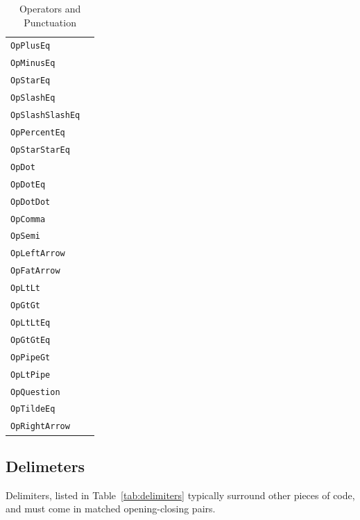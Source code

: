 \begin{table}[h]
{\begin{tabular}[t]{ll}
        \hline
        \texttt{OpPlusEq} & \op{+=} \\
        \texttt{OpMinusEq} & \op{-=} \\
        \texttt{OpStarEq} & \op{*=} \\
        \texttt{OpSlashEq} & \op{/=} \\
        \texttt{OpSlashSlashEq} & \op{//=} \\
        \texttt{OpPercentEq} & \op{\%=} \\
        \texttt{OpStarStarEq} & \op{**=} \\
        \hline
        \texttt{OpDot} & \op{.} \\
        \texttt{OpDotEq} & \op{.=} \\
        \texttt{OpDotDot} & \op{..} \\
        \texttt{OpComma} & \op{,} \\
        \texttt{OpSemi} & \op{;} \\
        \texttt{OpLeftArrow} & \op{<-} \\
        \texttt{OpFatArrow} & \op{=>} \\
        \hline
        \texttt{OpLtLt} & \op{<<} \\
        \texttt{OpGtGt} & \op{>>} \\
        \texttt{OpLtLtEq} & \op{<<=} \\
        \texttt{OpGtGtEq} & \op{>>=} \\
        \texttt{OpPipeGt} & \op{|>} \\
        \texttt{OpLtPipe} & \op{<|} \\
        \hline
        \texttt{OpQuestion} & \op{?} \\
        \texttt{OpTildeEq} & \op{\textasciitilde=} \\
        \texttt{OpRightArrow} & \op{->} \\
        \hline
    \end{tabular}
}
\caption{\label{tab:operators}Operators and Punctuation}
\end{table}

\subsection{Delimeters}

Delimiters, listed in Table~\ref{tab:delimiters} typically surround other
pieces of code, and must come in matched opening-closing pairs.

